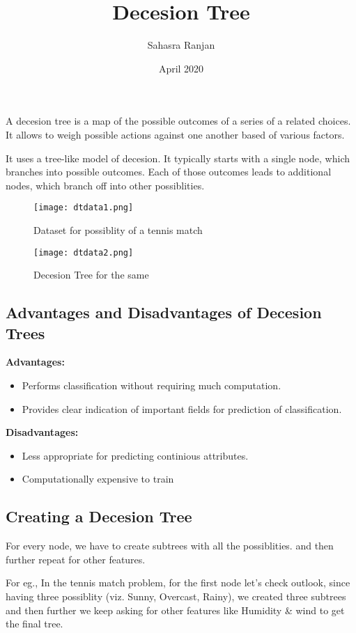 \documentclass[12pt, A4]{report}
\title{\textbf{Decesion Tree}}
\author{Sahasra Ranjan}
\date{April 2020}
\begin{document}
\begin{titlepage}
\maketitle
\end{titlepage}

A decesion tree is a map of the possible outcomes of a series of a related choices. It allows to weigh possible actions against one another based of various factors.\par
It uses a tree-like model of decesion. It typically starts with a single node, which branches into possible outcomes. Each of those outcomes leads to additional nodes, which branch off into other possiblities. 

\begin{figure}[h]
	\centering
	\texttt{[image: dtdata1.png]}
	\caption{Dataset for possiblity of a tennis match}
	\texttt{[image: dtdata2.png]}
	\caption{Decesion Tree for the same}
\end{figure}

\subsection*{Advantages and Disadvantages of Decesion Trees}
	\textbf{Advantages:}
	\begin{itemize}
		\item Performs classification without requiring much computation.
		\item Provides clear indication of important fields for prediction of classification.
	\end{itemize}
	\vspace{15mm}
	\textbf{Disadvantages:}
	\begin{itemize}
		\item Less appropriate for predicting continious attributes.
		\item Computationally expensive to train
	\end{itemize}

\vspace{5mm}
\subsection*{Creating a Decesion Tree}
	For every node, we have to create subtrees with all the possiblities. and then further repeat for other features.\par
	For eg., In the tennis match problem, for the first node  let's check outlook, since having three possiblity (viz. Sunny, Overcast, Rainy), we created three subtrees and then further we keep asking for other features like Humidity \& wind to get the final tree.  
\end{document}
